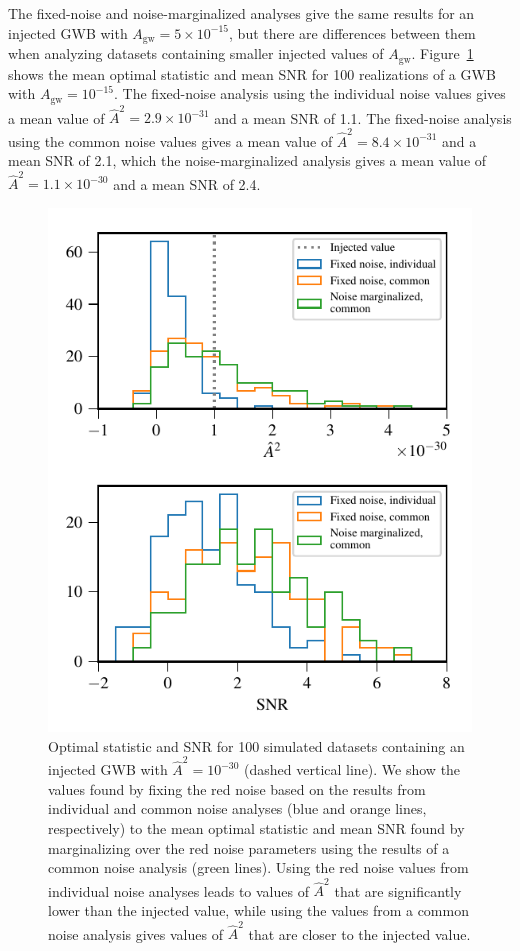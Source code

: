\documentclass[twocolumn,aps,prd,superscriptaddress]{revtex4-1}
\newcommand{\Agw}{\ensuremath{A_\mathrm{gw}}}
\begin{document}
The fixed-noise and noise-marginalized analyses give the same results 
for an injected GWB with $\Agw = 5\times10^{-15}$, 
but there are differences between them when analyzing datasets 
containing smaller injected values of $\Agw$. 
Figure~\ref{fig:os_datasetstats2} shows the mean optimal statistic and mean SNR 
for 100 realizations of a GWB with $\Agw = 10^{-15}$. 
The fixed-noise analysis using the individual noise values 
gives a mean value of $\hat{A}^2 = 2.9\times10^{-31}$ and a mean SNR of 1.1. 
The fixed-noise analysis using the common noise values 
gives a mean value of $\hat{A}^2 = 8.4\times10^{-31}$ and a mean SNR of 2.1, 
which the noise-marginalized analysis gives a mean value of 
$\hat{A}^2 = 1.1\times10^{-30}$ and a mean SNR of 2.4.
\begin{figure}[t]
	\includegraphics[width=0.95\columnwidth]{plots/optstat_A1e-15.pdf}
	\caption{Optimal statistic and SNR for 100 simulated datasets 
			containing an injected GWB with $\hat{A}^2 = 10^{-30}$ (dashed vertical line). 
			We show the values found by fixing the red noise 
			based on the results from individual and common noise analyses 
			(blue and orange lines, respectively) 
			to the mean optimal statistic and mean SNR found by marginalizing over 
			the red noise parameters using the results of a common noise analysis (green lines). 
			Using the red noise values from individual noise analyses leads to values of $\hat{A}^2$ 
			that are significantly lower than the injected value, 
			while using the values from a common noise analysis gives values of $\hat{A}^2$ 
			that are closer to the injected value.}
	\label{fig:os_datasetstats2}
\end{figure}
\end{document}
